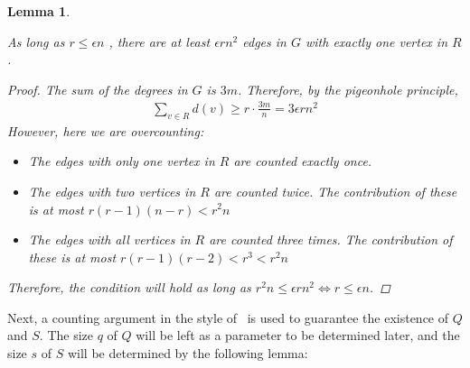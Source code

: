 \documentclass[12pt]{article}
\newtheorem{lemma}[thm]{Lemma}
\begin{document}
    \begin{lemma}\label{many_edges}

        As long as  $r \leq \epsilon n$ ,
        there are at least $\epsilon r n^2$ edges in $G$ with exactly one vertex in $R$.

        \begin{proof}
            The sum of the degrees in $G$ is $3m$.
            Therefore, by the pigeonhole principle,
            \begin{align*} \label{eq:pigeonhole}
                \sum_{v \in R} d(v) \geq r \cdot \frac{3m}{n} = 3 \epsilon r n^2
            \end{align*}
            However, here we are overcounting:
            \begin{itemize}
                \item The edges with only one vertex in $R$ are counted exactly once.
                \item The edges with two vertices in $R$ are counted twice.
                The contribution of these is at most $r(r-1)(n-r) < r^{2}n$
                \item The edges with all vertices in $R$ are counted three times.
                The contribution of these is at most $r(r-1)(r-2) < r^3 < r^{2}n$
            \end{itemize}

            Therefore, the condition will hold as long as
            $r^{2}n \leq \epsilon r n^2 \iff r \leq \epsilon n$.
        \end{proof}
    \end{lemma}

    Next, a counting argument in the style of~\cite{Kovari1954}
    is used to guarantee the existence of $Q$ and $S$.
    The size $q$ of $Q$ will be left as a parameter to be determined later,
    and the size $s$ of $S$ will be determined by the following lemma:
\end{document}
